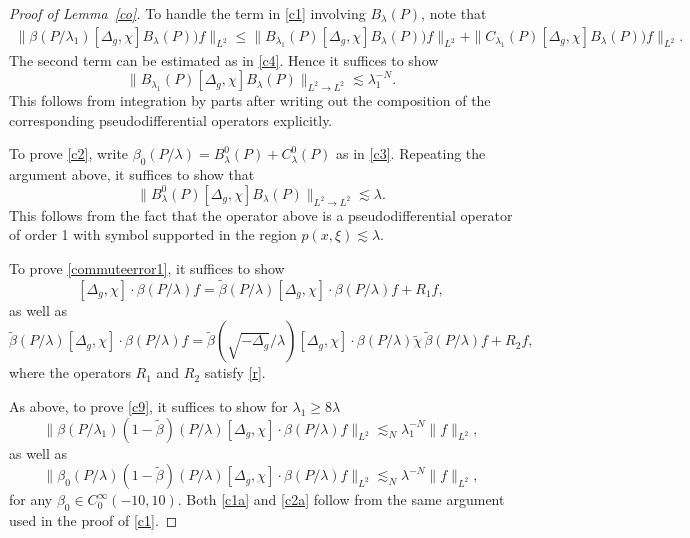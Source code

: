 \documentclass[10pt]{amsart}
\newcommand{\la}{\lambda}
\newcommand{\1}{{\bf 1}}
\begin{document}
\begin{proof}[Proof of Lemma~\ref{co}]
   To handle the term in \eqref{c1} involving $B_{\la}(P)$, note that
\begin{equation*}
\begin{split}
     \| \beta(P/\lambda_1)[\Delta_g, \chi]  B_{\la}(P)) f\|_{L^2}
\leq 
         \| B_{\la_1}(P)[\Delta_g, \chi]  B_{\la}(P)) f\|_{L^2}  +    \|C_{\la_1}(P)[\Delta_g, \chi]  B_{\la}(P)) f\|_{L^2}. 
\end{split}
\end{equation*}
The second term can be estimated as in \eqref{c4}.
Hence it suffices to show
\begin{equation}\label{c7}
    \|B_{\la_1}(P)[\Delta_g, \chi] B_{\la}(P)\|_{L^2\to L^2}\lesssim \la_1^{-N}.
\end{equation}
This follows from integration by parts after writing out the composition of the corresponding pseudodifferential operators explicitly.

To prove \eqref{c2},  write $  \beta_0( P/\la)
     = B^0_\la(P)+C^0_\la(P)$ as in \eqref{c3}. Repeating the argument above, it suffices to show that
\begin{equation}\label{c8}
    \|B^0_{\la}(P)[\Delta_g, \chi] B_{\la}(P)\|_{L^2\to L^2}\lesssim \la.
\end{equation}
This follows from the fact that the operator above is a pseudodifferential operator of order 1 with symbol supported in the region $p(x,\xi)\lesssim\la$.

To prove \eqref{commuteerror1}, it suffices to show 
\begin{equation}\label{c9}
    [\Delta_g,\chi] \cdot \beta(P/\la)f= \tilde\beta(P/\la)  [\Delta_g,\chi] \cdot \beta(P/\la)f
+R_1f,
\end{equation}
as well as 
\begin{equation}\label{c10}
   \tilde\beta(P/\la)  [\Delta_g,\chi] \cdot \beta(P/\la)f
   = \tilde\beta(\sqrt{-\Delta_g}/\la)  [\Delta_g,\chi] \cdot \beta(P/\la)\tilde\chi \,\tilde\beta(P/\la) f
+R_2f,
\end{equation}
where the operators $R_1$ and $R_2$ satisfy \eqref{r}.

As above, to prove \eqref{c9}, it suffices to show for $\la_1\ge 8\la$
\begin{equation}\label{c1a}
\| \beta(P/\la_1)(1-\tilde\beta)(P/\la)[\Delta_g,\chi] \cdot \beta(P/\la)f\|_{L^2}\lesssim_N \la_1^{-N}\|f\|_{L^2}, 
\end{equation}
as well as 
\begin{equation}\label{c2a}
\| \beta_0(P/\la)(1-\tilde\beta)(P/\la)[\Delta_g,\chi] \cdot \beta(P/\la)f\|_{L^2}\lesssim_N \la^{-N}\|f\|_{L^2},
\end{equation}
for any $\beta_0\in C_0^\infty(-10,10)$. 
Both \eqref{c1a} and \eqref{c2a} follow from the same argument used in the proof of \eqref{c1}.


\end{proof}
\end{document}
